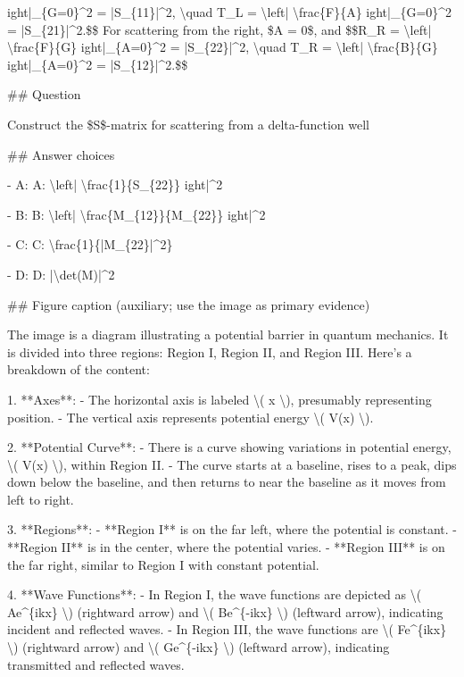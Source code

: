 ight|\_\{G=0\}\textasciicircum{}2 = |S\_\{11\}|\textasciicircum{}2, \textbackslash{}quad T\_L = \textbackslash{}left| \textbackslash{}frac\{F\}\{A\} 
ight|\_\{G=0\}\textasciicircum{}2 = |S\_\{21\}|\textasciicircum{}2.\$\$ For scattering from the right, \$A = 0\$, and \$\$R\_R = \textbackslash{}left| \textbackslash{}frac\{F\}\{G\} 
ight|\_\{A=0\}\textasciicircum{}2 = |S\_\{22\}|\textasciicircum{}2, \textbackslash{}quad T\_R = \textbackslash{}left| \textbackslash{}frac\{B\}\{G\} 
ight|\_\{A=0\}\textasciicircum{}2 = |S\_\{12\}|\textasciicircum{}2.\$\$

\#\# Question

Construct the \$S\$-matrix for scattering from a delta-function well

\#\# Answer choices

- A: A: \textbackslash{}left| \textbackslash{}frac\{1\}\{S\_\{22\}\} 
ight|\textasciicircum{}2

- B: B: \textbackslash{}left| \textbackslash{}frac\{M\_\{12\}\}\{M\_\{22\}\} 
ight|\textasciicircum{}2

- C: C: \textbackslash{}frac\{1\}\{|M\_\{22\}|\textasciicircum{}2\}

- D: D: |\textbackslash{}det(M)|\textasciicircum{}2

\#\# Figure caption (auxiliary; use the image as primary evidence)

The image is a diagram illustrating a potential barrier in quantum mechanics. It is divided into three regions: Region I, Region II, and Region III. Here’s a breakdown of the content:

1. **Axes**:
   - The horizontal axis is labeled \textbackslash{}( x \textbackslash{}), presumably representing position.
   - The vertical axis represents potential energy \textbackslash{}( V(x) \textbackslash{}).

2. **Potential Curve**:
   - There is a curve showing variations in potential energy, \textbackslash{}( V(x) \textbackslash{}), within Region II. 
   - The curve starts at a baseline, rises to a peak, dips down below the baseline, and then returns to near the baseline as it moves from left to right.

3. **Regions**:
   - **Region I** is on the far left, where the potential is constant.
   - **Region II** is in the center, where the potential varies.
   - **Region III** is on the far right, similar to Region I with constant potential.

4. **Wave Functions**:
   - In Region I, the wave functions are depicted as \textbackslash{}( Ae\textasciicircum{}\{ikx\} \textbackslash{}) (rightward arrow) and \textbackslash{}( Be\textasciicircum{}\{-ikx\} \textbackslash{}) (leftward arrow), indicating incident and reflected waves.
   - In Region III, the wave functions are \textbackslash{}( Fe\textasciicircum{}\{ikx\} \textbackslash{}) (rightward arrow) and \textbackslash{}( Ge\textasciicircum{}\{-ikx\} \textbackslash{}) (leftward arrow), indicating transmitted and reflected waves.

